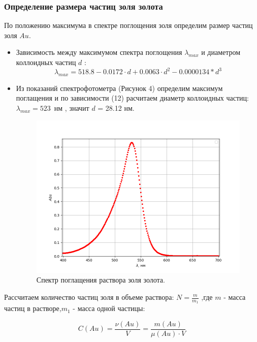 \documentclass[a4paper,12pt]{article}
\begin{document}
\subsubsection{Определение размера частиц золя золота}

По положению максимума в спектре поглощения золя определим размер частиц золя $Au$.
\begin{itemize}
    \item Зависимость между максимумом спектра поглощения $\lambda_{max}$ и диаметром коллоидных частиц $d$ \cite{2} :
\begin{equation}
    \lambda_{max} = 518.8-0.0172\cdot d+0.0063\cdot d^2-0.0000134*d^3
\end{equation}
\item Из показаний спектрофотометра (Рисунок 4)  определим максимум поглащения и по зависимости (12) расчитаем диаметр коллоидных частиц: $\lambda_{max} = 523$~нм , значит $d$ = 28.12 нм.
\begin{figure}[h!]
    \centering
    \includegraphics[scale = 0.5]{rrrr.png}
    \caption{Спектр поглащения раствора золя золота.}
    \label{fig : 1}
\end{figure}



\end{itemize}





Рассчитаем количество частиц золя в объеме раствора:
$N=\frac{m}{m_1}$   ,где $m$ - масса частиц в растворе,$m_1$ - масса одной частицы:

\[C(Au)=\frac{\nu(Au)}{V}=\frac{m(Au)}{\mu(Au)\cdot V}\]
\end{document}
